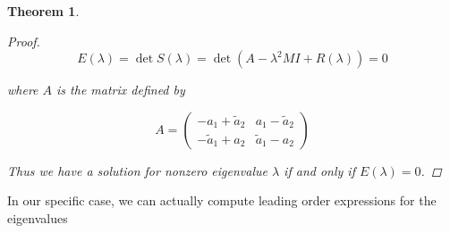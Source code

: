 \documentclass[12pt]{article}
\newtheorem{theorem}{Theorem}
\begin{document}
\begin{theorem}
\begin{proof}
\[
E(\lambda) = \det S(\lambda) = \det(A - \lambda^2 MI + R(\lambda) ) = 0
\]

where $A$ is the matrix defined by

\[
A = 
\begin{pmatrix}
-a_1 + \tilde{a}_2 & a_1 - \tilde{a}_2 \\
-\tilde{a}_1 + a_2 & \tilde{a}_1 - a_2 
\end{pmatrix}
\]

Thus we have a solution for nonzero eigenvalue $\lambda$ if and only if $E(\lambda) = 0$.

\end{proof}
\end{theorem}

In our specific case, we can actually compute leading order expressions for the eigenvalues
\end{document}
